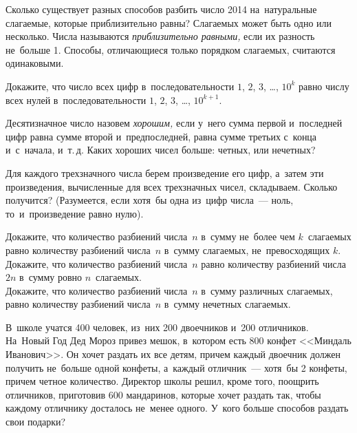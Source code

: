 


\begin{problems}

\item
Сколько существует разных способов разбить число 2014 на~натуральные слагаемые,
которые приблизительно равны?
Слагаемых может быть одно или несколько.
Числа называются \emph{приблизительно равными,} если их разность не~больше 1.
Способы, отличающиеся только порядком слагаемых, считаются одинаковыми.

\item
Докажите, что число всех цифр в~последовательности
$1$, $2$, $3$, \ldots, $10^{k}$ равно числу всех нулей в~последовательности
$1$, $2$, $3$, \ldots, $10^{k+1}$.

\item
Десятизначное число назовем \emph{хорошим,} если у~него сумма первой
и~последней цифр равна сумме второй и~предпоследней, равна сумме третьих
с~конца и~с~начала, и~т.\,д.
Каких хороших чисел больше: четных, или нечетных?

\item
Для каждого трехзначного числа берем произведение его цифр, а~затем эти
произведения, вычисленные для всех трехзначных чисел, складываем.
Сколько получится?
(Разумеется, если хотя~бы одна из~цифр числа~--- ноль, то~и~произведение равно
нулю).

\item
\subproblem
Докажите, что количество разбиений числа~$n$ в~сумму не~более чем
$k$~слагаемых равно количеству разбиений числа~$n$ в~сумму слагаемых,
не~превосходящих $k$.
\\
\subproblem
Докажите, что количество разбиений числа~$n$ равно количеству разбиений
числа~$2n$ в~сумму ровно $n$~слагаемых.
\\
\subproblem
Докажите, что количество разбиений числа~$n$ в~сумму различных слагаемых,
равно количеству разбиений числа~$n$ в~сумму нечетных слагаемых.

\item
В~школе учатся 400 человек, из~них 200 двоечников и~200 отличников.
На~Новый Год Дед Мороз привез мешок, в~котором есть 800 конфет
<<Миндаль Иванович>>.
Он хочет раздать их все детям, причем каждый двоечник должен получить не~больше
одной конфеты, а~каждый отличник~--- хотя~бы 2 конфеты, причем четное
количество.
Директор школы решил, кроме того, поощрить отличников, приготовив
600 мандаринов, которые хочет раздать так, чтобы каждому отличнику досталось
не~менее одного.
У~кого больше способов раздать свои подарки?


\end{problems}
